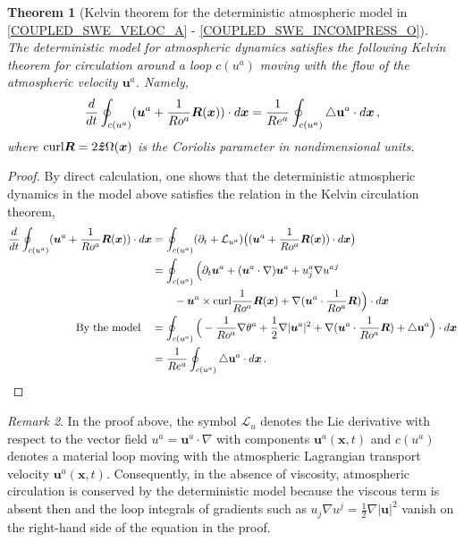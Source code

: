 \documentclass[11pt, oneside]{article}   	%
\numberwithin{equation}{section}
\theoremstyle{plain}
\newtheorem{theorem}{Theorem}[section]
\theoremstyle{definition}
\theoremstyle{remark}
\newtheorem{remark}[theorem]{Remark}
\newcommand{\<}{\langle}
\renewcommand{\>}{\rangle}
\def\U{{\bf u}}
\newcommand{\bs}[1]{\boldsymbol{#1}}
\begin{document}
\begin{theorem}[Kelvin theorem for the deterministic atmospheric model in \eqref{COUPLED_SWE_VELOC_A} - \eqref{COUPLED_SWE_INCOMPRESS_O}]$
\label{KelvinThm_atmosphere_determnistic}\,$\\
The deterministic model for atmospheric dynamics satisfies the following Kelvin theorem for circulation around a loop $c(u^a)$ moving with the flow of the atmospheric velocity $\bs{u}^a$. Namely,
\begin{align*}
\frac{d}{dt}\oint_{c(u^a)} (\bs{u}^a + \frac{1}{Ro^a}\bs{R}(\bs{x}))\cdot d\bs{x}
= \frac{1}{Re^a}\oint_{c(u^a)} \triangle\U^a \cdot d\bs{x}
\,,
\end{align*}
where ${\rm curl}\bs{R} = 2\bs{\hat{z}}\Omega(\bs{x})$ is the Coriolis parameter in nondimensional units.
\end{theorem}

\begin{proof}
By direct calculation, one shows that the deterministic atmospheric dynamics in the model above satisfies the relation in the Kelvin circulation theorem,
\begin{align*}
\frac{d}{dt}\oint_{c(u^a)} (\bs{u}^a + \frac{1}{Ro^a}\bs{R}(\bs{x}))\cdot d\bs{x}
&=
\oint_{c(u^a)} (\partial_t + \mathcal{L}_{u^a}) \big((\bs{u}^a + \frac{1}{Ro^a}\bs{R}(\bs{x}))\cdot d\bs{x}\big)
\\&= \oint_{c(u^a)} \Big( 
\partial_t \bs{u}^a + (\bs{u}^a\cdot\nabla)\bs{u}^a + u_j^a\nabla {u^a}^j
\\& \qquad- \bs{u}^a\times {\rm curl}\frac{1}{Ro^a}\bs{R}(\bs{x}) 
+ \nabla (\bs{u}^a\cdot\frac{1}{Ro^a}\bs{R})
\Big)\cdot d\bs{x} 
\\\hbox{By the model}\quad& =  \oint_{c(u^a)}\Big(- \frac{1}{Ro^a}\nabla\theta^a
+ \frac12\nabla |\bs{u}^a|^2 + \nabla (\bs{u}^a\cdot\frac{1}{Ro^a}\bs{R}) +  \triangle\U^a 
\Big)\cdot d\bs{x} 
\\& = \frac{1}{Re^a}\oint_{c(u^a)} \triangle\U^a \cdot d\bs{x}
\,.
\end{align*}
\end{proof}
\begin{remark}
In the proof above, the symbol $\mathcal{L}_u$ denotes the Lie derivative with respect to the vector field $u^a=\bs{u}^a \cdot\nabla$ with components $\bs{u}^a(\bs{x},t)$ and $c(u^a)$ denotes a material loop moving with the atmospheric Lagrangian transport velocity $\bs{u}^a(\bs{x},t)$.
Consequently, in the absence of viscosity, atmospheric circulation is conserved by the deterministic model because the viscous term is absent then and the loop integrals of gradients such as $u_j\nabla u^j=\frac12\nabla |\bs{u}|^2$ vanish on the right-hand side of the equation in the proof. \\
\end{remark}
\end{document}
